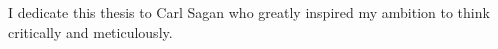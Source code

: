 I dedicate this thesis to Carl Sagan who greatly inspired my ambition to think critically and meticulously.
